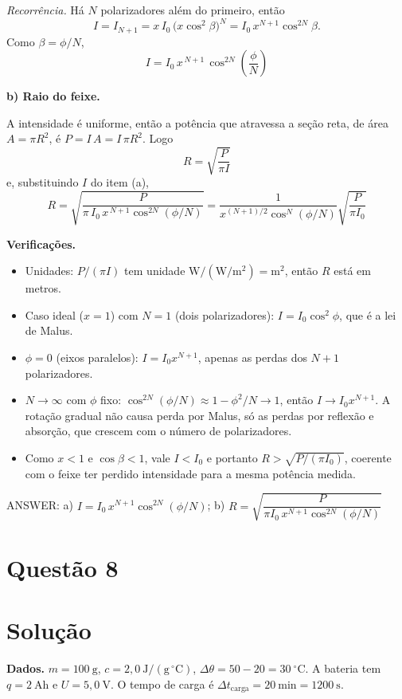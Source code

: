 \documentclass{article}%
\begin{document}
\emph{Recorrência.} Há $N$ polarizadores além do primeiro, então
\[
I = I_{N+1}= x\,I_0\,\bigl(x\cos^2\beta\bigr)^{N}= I_0\,x^{N+1}\cos^{2N}\beta .
\]
Como $\beta=\phi/N$,
\[
\boxed{I = I_0\,x^{\,N+1}\,\cos^{2N}\!\left(\frac{\phi}{N}\right)}
\]

\medskip
\textbf{b) Raio do feixe.}

A intensidade é uniforme, então a potência que atravessa a seção reta, de área $A=\pi R^2$, é $P = I\,A = I\,\pi R^2$. Logo
\[
R=\sqrt{\frac{P}{\pi I}}
\]
e, substituindo $I$ do item (a),
\[
\boxed{R=\sqrt{\frac{P}{\pi\, I_0\, x^{\,N+1}\cos^{2N}(\phi/N)}}
=\frac{1}{x^{(N+1)/2}\cos^{N}(\phi/N)}\sqrt{\frac{P}{\pi I_0}}}
\]

\medskip
\textbf{Verificações.}
\begin{itemize}
\item Unidades: $P/(\pi I)$ tem unidade $\mathrm{W}/(\mathrm{W/m^2})=\mathrm{m^2}$, então $R$ está em metros.
\item Caso ideal ($x=1$) com $N=1$ (dois polarizadores): $I=I_0\cos^2\phi$, que é a lei de Malus.
\item $\phi=0$ (eixos paralelos): $I=I_0x^{N+1}$, apenas as perdas dos $N+1$ polarizadores.
\item $N\to\infty$ com $\phi$ fixo: $\cos^{2N}(\phi/N)\approx 1-\phi^2/N\to 1$, então $I\to I_0 x^{N+1}$. A rotação gradual não causa perda por Malus, só as perdas por reflexão e absorção, que crescem com o número de polarizadores.
\item Como $x<1$ e $\cos\beta<1$, vale $I<I_0$ e portanto $R>\sqrt{P/(\pi I_0)}$, coerente com o feixe ter perdido intensidade para a mesma potência medida.
\end{itemize}

ANSWER: a) $I=I_0\,x^{N+1}\cos^{2N}(\phi/N)$; b) $R=\sqrt{\dfrac{P}{\pi I_0\,x^{N+1}\cos^{2N}(\phi/N)}}$
%
\newpage%
\section*{Questão 8}

\section*{Solução}

\textbf{Dados.} $m=100\ \mathrm{g}$, $c=2{,}0\ \mathrm{J/(g\,^\circ C)}$, $\Delta\theta=50-20=30\ ^\circ\mathrm{C}$. A bateria tem $q=2\ \mathrm{Ah}$ e $U=5{,}0\ \mathrm{V}$. O tempo de carga é $\Delta t_{\text{carga}}=20\ \mathrm{min}=1200\ \mathrm{s}$.
\end{document}
